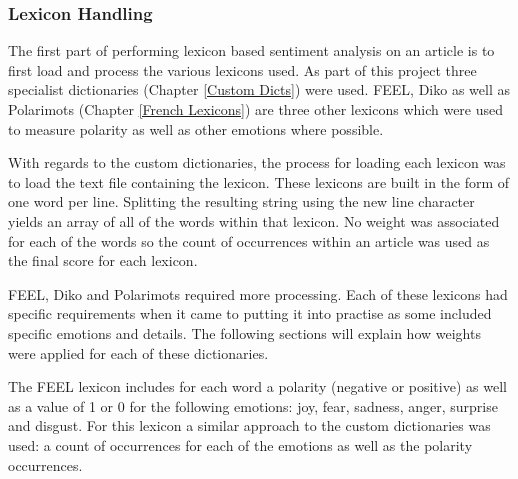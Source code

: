 \subsubsection{Lexicon Handling}

The first part of performing lexicon based sentiment analysis on an article is to first load and process the various lexicons used. As part of this project three specialist dictionaries (Chapter \ref{Custom Dicts}) were used. FEEL, Diko as well as Polarimots (Chapter \ref{French Lexicons}) are three other lexicons which were used to measure polarity as well as other emotions where possible.

With regards to the custom dictionaries, the process for loading each lexicon was to load the text file containing the lexicon. These lexicons are built in the form of one word per line. Splitting the resulting string using the new line character yields an array of all of the words within that lexicon. No weight was associated for each of the words so the count of occurrences within an article was used as the final score for each lexicon.

FEEL, Diko and Polarimots required more processing. Each of these lexicons had specific requirements when it came to putting it into practise as some included specific emotions and details. The following sections will explain how weights were applied for each of these dictionaries.

The FEEL lexicon includes for each word a polarity (negative or positive) as well as a value of 1 or 0 for the following emotions: joy, fear, sadness, anger, surprise and disgust. For this lexicon a similar approach to the custom dictionaries was used: a count of occurrences for each of the emotions as well as the polarity occurrences.


